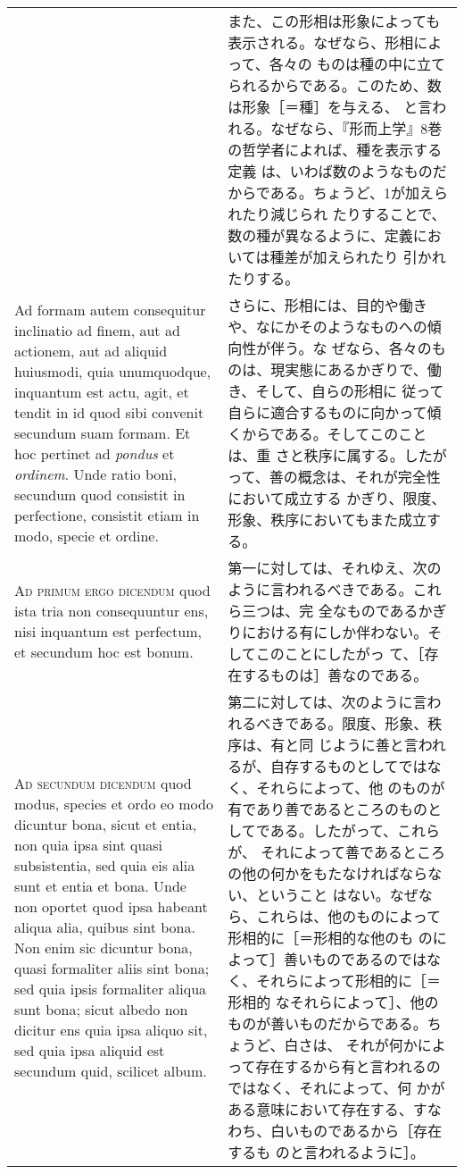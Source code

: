\documentclass[10pt]{jsarticle} %
\begin{document}
\begin{longtable}{p{21em}p{21em}}
&


また、この形相は形象によっても表示される。なぜなら、形相によって、各々の
 ものは種の中に立てられるからである。このため、数は形象［＝種］を与える、
 と言われる。なぜなら、『形而上学』8巻の哲学者によれば、種を表示する定義
 は、いわば数のようなものだからである。ちょうど、1が加えられたり減じられ
 たりすることで、数の種が異なるように、定義においては種差が加えられたり
 引かれたりする。

\\

Ad formam autem consequitur inclinatio ad finem, aut ad actionem, aut ad
 aliquid huiusmodi, quia unumquodque, inquantum est actu, agit, et
 tendit in id quod sibi convenit secundum suam formam. Et hoc pertinet
 ad {\itshape pondus} et {\itshape ordinem}. Unde ratio boni, secundum quod consistit in
 perfectione, consistit etiam in modo, specie et ordine.

&

さらに、形相には、目的や働きや、なにかそのようなものへの傾向性が伴う。な
 ぜなら、各々のものは、現実態にあるかぎりで、働き、そして、自らの形相に
 従って自らに適合するものに向かって傾くからである。そしてこのことは、重
 さと秩序に属する。したがって、善の概念は、それが完全性において成立する
 かぎり、限度、形象、秩序においてもまた成立する。


\\

{\scshape Ad primum ergo dicendum} quod ista tria non consequuntur ens, nisi
 inquantum est perfectum, et secundum hoc est bonum.

&

第一に対しては、それゆえ、次のように言われるべきである。これら三つは、完
 全なものであるかぎりにおける有にしか伴わない。そしてこのことにしたがっ
 て、［存在するものは］善なのである。

\\

{\scshape Ad secundum dicendum} quod modus, species et ordo eo modo dicuntur
 bona, sicut et entia, non quia ipsa sint quasi subsistentia, sed quia
 eis alia sunt et entia et bona. Unde non oportet quod ipsa habeant
 aliqua alia, quibus sint bona. Non enim sic dicuntur bona, quasi
 formaliter aliis sint bona; sed quia ipsis formaliter aliqua sunt bona;
 sicut albedo non dicitur ens quia ipsa aliquo sit, sed quia ipsa
 aliquid est secundum quid, scilicet album.

&

第二に対しては、次のように言われるべきである。限度、形象、秩序は、有と同
 じように善と言われるが、自存するものとしてではなく、それらによって、他
 のものが有であり善であるところのものとしてである。したがって、これらが、
 それによって善であるところの他の何かをもたなければならない、ということ
 はない。なぜなら、これらは、他のものによって形相的に［＝形相的な他のも
 のによって］善いものであるのではなく、それらによって形相的に［＝形相的
 なそれらによって］、他のものが善いものだからである。ちょうど、白さは、
 それが何かによって存在するから有と言われるのではなく、それによって、何
 かがある意味において存在する、すなわち、白いものであるから［存在するも
 のと言われるように］。


\end{longtable}
\end{document}
